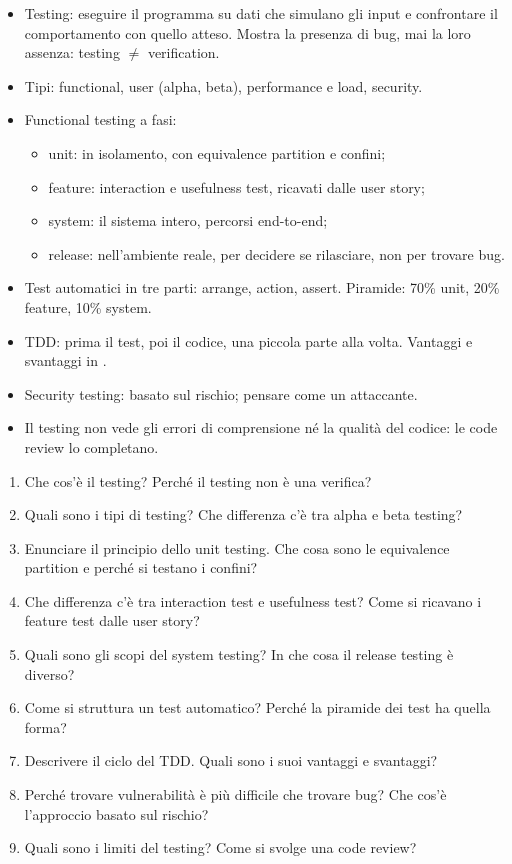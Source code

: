 \begin{puntichiave}
\begin{itemize}
  \item Testing: eseguire il programma su dati che simulano gli input e confrontare il comportamento con quello atteso.
    Mostra la presenza di bug, mai la loro assenza: testing $\neq$ verification.
  \item Tipi: functional, user (alpha, beta), performance e load, security.
  \item Functional testing a fasi:
    \begin{itemize}
      \item unit: in isolamento, con equivalence partition e confini;
      \item feature: interaction e usefulness test, ricavati dalle user story;
      \item system: il sistema intero, percorsi end-to-end;
      \item release: nell'ambiente reale, per decidere se rilasciare, non per trovare bug.
    \end{itemize}
  \item Test automatici in tre parti: arrange, action, assert. Piramide: 70\% unit, 20\% feature, 10\% system.
  \item TDD: prima il test, poi il codice, una piccola parte alla volta. Vantaggi e svantaggi in .
  \item Security testing: basato sul rischio; pensare come un attaccante.
  \item Il testing non vede gli errori di comprensione né la qualità del codice: le code review lo completano.
\end{itemize}
\end{puntichiave}

\begin{domande}
\begin{enumerate}
  \item Che cos'è il testing? Perché il testing non è una verifica?
  \item Quali sono i tipi di testing? Che differenza c'è tra alpha e beta testing?
  \item Enunciare il principio dello unit testing. Che cosa sono le equivalence partition e perché si testano i confini?
  \item Che differenza c'è tra interaction test e usefulness test? Come si ricavano i feature test dalle user story?
  \item Quali sono gli scopi del system testing? In che cosa il release testing è diverso?
  \item Come si struttura un test automatico? Perché la piramide dei test ha quella forma?
  \item Descrivere il ciclo del TDD. Quali sono i suoi vantaggi e svantaggi?
  \item Perché trovare vulnerabilità è più difficile che trovare bug? Che cos'è l'approccio basato sul rischio?
  \item Quali sono i limiti del testing? Come si svolge una code review?
\end{enumerate}
\end{domande}
